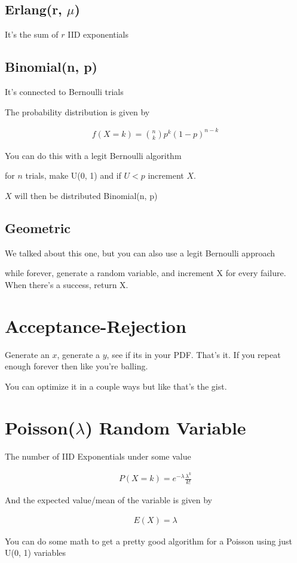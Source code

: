 \documentclass[fleqn]{report}
\newcommand{\equations} [1] {
\begin{gather*}
#1
\end{gather*}
}
\begin{document}
\subsection{Erlang(r, $\mu$)}
It's the sum of $r$ IID exponentials 

\subsection{Binomial(n, p)}
It's connected to Bernoulli trials 

The probability distribution is given by 
\equations{
    f(X = k)
    =
    {n \choose k } p^k (1 - p)^{n-k}
}

You can do this with a legit Bernoulli algorithm 

for $n$ trials, make U(0, 1) and if $U < p$ increment $X$.

$X$ will then be distributed Binomial(n, p)

\subsection{Geometric}
We talked about this one, but you can also use a legit Bernoulli approach 

while forever, generate a random variable, and increment X for every failure.
When there's a success, return X. 

\section{Acceptance-Rejection}
Generate an $x$, generate a $y$, see if its in your PDF. That's it. If you 
repeat enough forever then like you're balling.

You can optimize it in a couple ways but like that's the gist. 

\section{Poisson($\lambda$) Random Variable}
The number of IID Exponentials under some value 

\equations{
    P(X = k)
    =
    e^{-\lambda}
    \frac{\lambda^{k}}{k!}
}

And the expected value/mean of the variable is given by 

\equations{
    E(X) = \lambda 
}

You can do some math to get a pretty good algorithm for a Poisson 
using just U(0, 1) variables
\end{document}
